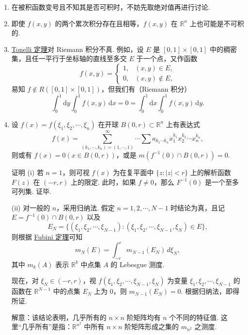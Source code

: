 \documentclass[../../main.tex]{subfiles}
\begin{document}
\begin{remark}
\begin{enumerate}
\item 在被积函数变号且不知其是否可积时，不妨先取绝对值再进行讨论.

\item 即使 \( f(x, y) \) 的两个累次积分存在且相等，\( f(x, y) \) 在 \( \mathbb{R}^n \) 上也可能是不可积的.

\item \hyperref[theorem:Tonelli 定理 非负可测函数的情形]{Tonelli 定理}对 Riemann 积分不真. 例如，设 \( E \) 是 \( [0, 1] \times [0, 1] \) 中的稠密集，且任一平行于坐标轴的直线至多交 \( E \) 于一个点，又作函数
\[
f(x, y) = 
\begin{cases} 
1, & (x, y) \in E, \\
0, & (x, y) \notin E,
\end{cases}
\]
易知 \( f \notin R([0, 1] \times [0, 1]) \)，但我们有（Riemann 积分）
\[
\int_0^1 \mathrm{d}y \int_0^1 f(x, y) \, \mathrm{d}x = 0 = \int_0^1 \mathrm{d}x \int_0^1 f(x, y) \, \mathrm{d}y.
\]

\item 设 \( f(x) = f(\xi_1, \xi_2, \cdots, \xi_n) \) 在开球 \( B(0, r) \subset \mathbb{R}^n \) 上有表达式
\[
f(x) = \sum_{(k_1, \cdots, k_n) = (1, \cdots, 1)}^{\infty} \cdots \sum a_{k_1 \cdots k_n} x_1^{k_1} x_2^{k_2} \cdots x_n^{k_n},
\]
则或有 \( f(x) = 0 (x \in B(0, r)) \)，或是 \( m(f^{-1}(0) \cap B(0, r)) = 0 \).

证明 (i) 若 \( n = 1 \)，则可视 \( f(x) \) 为在复平面中 \( \{ z : |z| < r \} \) 上的解析函数 \( F(z) \) 在 \( (-r, r) \) 上的限定. 此时，如果 \( f \neq 0 \)，那么 \( F^{-1}(0) \) 是一个至多可列集. 证毕.

(ii) 对一般的 \( n \)，采用归纳法. 假定 \( n = 1, 2, \cdots, N - 1 \) 时结论为真，且记 \( E = f^{-1}(0) \cap B(0, r) \) 以及
\[
E_N = \{ (\xi_1, \xi_2, \cdots, \xi_{N - 1}) : (\xi_1, \xi_2, \cdots, \xi_{N - 1}, \xi_N) \in E \},
\]
则根据 \hyperref[theorem:Fubini定理 可积函数的情形]{Fubini 定理}可知
\[
m_N(E) = \int_{-r}^r m_{N - 1}(E_N) \, d\xi_N,
\]
其中 \( m_k(A) \) 表示 \( \mathbb{R}^k \) 中点集 \( A \) 的 Lebesgue 测度.

现在，对 \( \xi_N \in (-r, r) \)，视 \( f(\xi_1, \xi_2, \cdots, \xi_{N - 1}, \xi_N) \) 为变量 \( \xi_1, \xi_2, \cdots, \xi_{N - 1} \) 的函数在 \( \mathbb{R}^{N - 1} \) 中的点集 \( E_N \) 上为 0，则 \( m_{N - 1}(E_N) = 0 \). 根据归纳法，即得所证.

解意：该结论表明，几乎所有的 \( n \times n \) 阶矩阵均有 \( n \) 个不同的特征值. 这里“几乎所有”是指：\( \mathbb{R}^{n^2} \) 中所有 \( n \times n \) 阶矩阵形成之集的 \( m_{n^2} \) 之测度.
\end{enumerate}
\end{remark}
\end{document}
